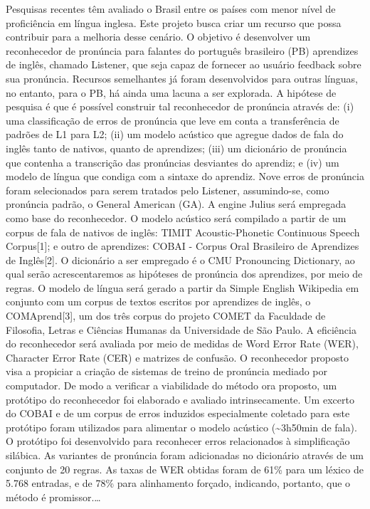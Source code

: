Pesquisas recentes t\^em avaliado o Brasil entre os pa\'ises com menor n\'ivel
de profici\^encia em l\'ingua inglesa. Este projeto busca criar um recurso
que possa contribuir para a melhoria desse cen\'ario. O objetivo \'e
desenvolver um reconhecedor de pron\'uncia para falantes do portugu\^es
brasileiro (PB) aprendizes de ingl\^es, chamado Listener, que seja capaz
de fornecer ao usu\'ario feedback sobre sua pron\'uncia. Recursos
semelhantes j\'a foram desenvolvidos para outras l\'inguas, no entanto, para
o PB, h\'a ainda uma lacuna a ser explorada. A hip\'otese de pesquisa \'e que
\'e poss\'ivel construir tal reconhecedor de pron\'uncia atrav\'es de: (i) uma
classifica\c{c}\~ao de erros de pron\'uncia que leve em conta a transfer\^encia de
padr\~oes de L1 para L2; (ii) um modelo ac\'ustico que agregue dados de fala
do ingl\^es tanto de nativos, quanto de aprendizes; (iii) um dicion\'ario de
pron\'uncia que contenha a transcri\c{c}\~ao das pron\'uncias desviantes do
aprendiz; e (iv) um modelo de l\'ingua que condiga com a sintaxe do
aprendiz. Nove erros de pron\'uncia foram selecionados para serem tratados
pelo Listener, assumindo-se, como pron\'uncia padr\~ao, o General American
(GA). A engine Julius ser\'a empregada como base do reconhecedor. O modelo
ac\'ustico ser\'a compilado a partir de um corpus de fala de nativos de
ingl\^es: TIMIT Acoustic-Phonetic Continuous Speech Corpus{[}1{]}; e outro
de aprendizes: COBAI - Corpus Oral Brasileiro de Aprendizes de
Ingl\^es{[}2{]}. O dicion\'ario a ser empregado \'e o CMU Pronouncing
Dictionary, ao qual ser\~ao acrescentaremos as hip\'oteses de pron\'uncia dos
aprendizes, por meio de regras. O modelo de l\'ingua ser\'a gerado a partir
da Simple English Wikipedia em conjunto com um corpus de textos escritos
por aprendizes de ingl\^es, o COMAprend{[}3{]}, um dos tr\^es corpus do
projeto COMET da Faculdade de Filosofia, Letras e Ci\^encias Humanas da
Universidade de S\~ao Paulo. A efici\^encia do reconhecedor ser\'a avaliada
por meio de medidas de Word Error Rate (WER), Character Error Rate (CER)
e matrizes de confus\~ao. O reconhecedor proposto visa a propiciar a
cria\c{c}\~ao de sistemas de treino de pron\'uncia mediado por computador. De
modo a verificar a viabilidade do m\'etodo ora proposto, um prot\'otipo do
reconhecedor foi elaborado e avaliado intrinsecamente. Um excerto do
COBAI e de um corpus de erros induzidos especialmente coletado para este
prot\'otipo foram utilizados para alimentar o modelo ac\'ustico
(\textasciitilde{}3h50min de fala). O prot\'otipo foi desenvolvido para
reconhecer erros relacionados à simplifica\c{c}\~ao sil\'abica. As variantes de
pron\'uncia foram adicionadas no dicion\'ario atrav\'es de um conjunto de 20
regras. As taxas de WER obtidas foram de 61\% para um l\'exico de 5.768
entradas, e de 78\% para alinhamento for\c{c}ado, indicando, portanto, que o
m\'etodo \'e promissor.\dots

